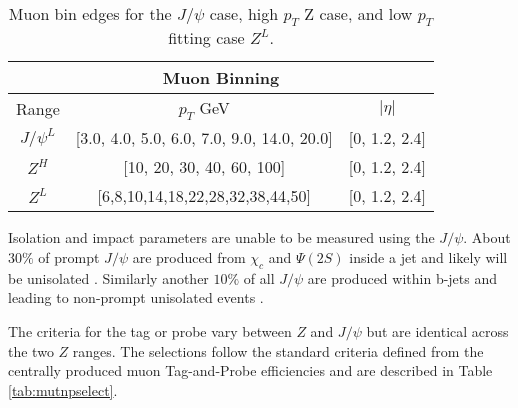 \begin{table}
\centering
\caption{Muon bin edges for the $J/\psi$ case, high $p_T$ Z case, and low $p_T$ fitting case $Z^{L}$. }
\label{tab:mubin}
\begin{tabular}{c|c|c}
\hline 
\multicolumn{3}{c}{Muon Binning} \\ 
\hline 
Range & $p_T$ GeV & $|\eta|$ \\ 
\hline 
$J/\psi^{L}$ & [3.0, 4.0,  5.0, 6.0, 7.0, 9.0, 14.0,  20.0] & [0, 1.2, 2.4] \\ 

$Z^{H}$ &  [10, 20, 30, 40, 60, 100] & [0, 1.2, 2.4] \\ 

$Z^{L}$ & [6,8,10,14,18,22,28,32,38,44,50] & [0, 1.2, 2.4] \\ 
\hline 
\end{tabular} 
\end{table}



Isolation and impact parameters are unable to be measured using the $J/\psi$. About $30\%$ of prompt $J/\psi$ are produced from $\chi_c$ and $\Psi(2S)$ inside a jet and likely will be unisolated \cite{Lansberg:2006dh}. Similarly another $10\%$ of all $J/\psi$ are produced within b-jets and leading to  non-prompt  unisolated events \cite{LHCb:2013itw}.

The criteria for the tag or probe vary between $Z$ and $J/\psi$ but are identical across the two $Z$ ranges. The selections follow the standard criteria defined from the centrally produced muon Tag-and-Probe efficiencies and are described in Table \ref{tab:mutnpselect}.\\


